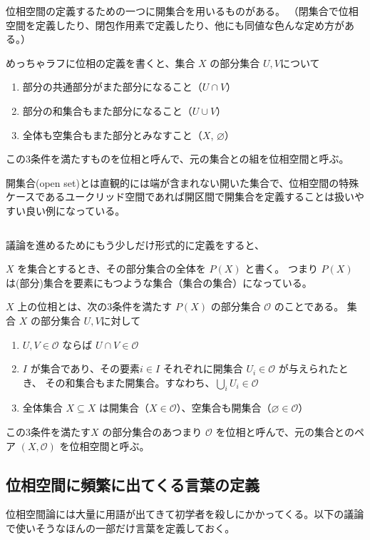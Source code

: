 \documentclass[uplatex,a4j,12pt,dvipdfmx]{jsarticle}
\begin{document}
位相空間の定義するための一つに開集合を用いるものがある。
（閉集合で位相空間を定義したり、閉包作用素で定義したり、他にも同値な色んな定め方がある。）

めっちゃラフに位相の定義を書くと、集合 $X$ の部分集合 $U,V$について

\begin{enumerate}
	\item 部分の共通部分がまた部分になること（$U \cap V$）
	\item 部分の和集合もまた部分になること（$U \cup V$）
	\item 全体も空集合もまた部分とみなすこと（$X$, $\varnothing$）
\end{enumerate}

この3条件を満たすものを位相と呼んで、元の集合との組を位相空間と呼ぶ。

開集合(open set)とは直観的には端が含まれない開いた集合で、位相空間の特殊ケースであるユークリッド空間であれば開区間で開集合を定義することは扱いやすい良い例になっている。

${}$

議論を進めるためにもう少しだけ形式的に定義をすると、

$X$ を集合とするとき、その部分集合の全体を $P(X)$ と書く。
つまり $P(X)$ は(部分)集合を要素にもつような集合（集合の集合）になっている。

$X$ 上の位相とは、次の3条件を満たす $P(X)$ の部分集合 ${\mathcal O}$ のことである。
集合 $X$ の部分集合 $U,V$に対して
\begin{enumerate}
	\item $U,V \in {\mathcal O}$ ならば $U \cap V \in {\mathcal O}$
	\item $I$ が集合であり、その要素$i \in I$ それぞれに開集合 $U_{i} \in {\mathcal O}$ が与えられたとき、
	      その和集合もまた開集合。すなわち、$\bigcup_{i} U_{i} \in {\mathcal O}$
	\item 全体集合 $X \subseteq X$ は開集合（$X \in {\mathcal O}$）、空集合も開集合（$\varnothing \in {\mathcal O}$）
\end{enumerate}

この3条件を満たす$X$ の部分集合のあつまり ${\mathcal O}$ を位相と呼んで、元の集合とのペア $(X, {\mathcal O})$ を位相空間と呼ぶ。

\subsection{位相空間に頻繁に出てくる言葉の定義}

位相空間論には大量に用語が出てきて初学者を殺しにかかってくる。以下の議論で使いそうなほんの一部だけ言葉を定義しておく。
\end{document}
